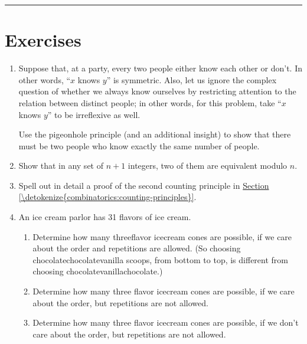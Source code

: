 \documentclass[letterpaper,10pt,english]{sphinxmanual}
\begin{document}
\bigskip\hrule\bigskip



\section{Exercises}
\label{\detokenize{combinatorics:exercises}}\begin{enumerate}
%
\item {} 
\sphinxAtStartPar
Suppose that, at a party, every two people either know each other or don’t. In other words, “\(x\) knows \(y\)” is symmetric. Also, let us ignore the complex question of whether we always know ourselves by restricting attention to the relation between distinct people; in other words, for this problem, take “\(x\) knows \(y\)” to be irreflexive as well.

\sphinxAtStartPar
Use the pigeonhole principle (and an additional insight) to show that there must be two people who know exactly the same number of people.

\item {} 
\sphinxAtStartPar
Show that in any set of \(n + 1\) integers, two of them are equivalent modulo \(n\).

\item {} 
\sphinxAtStartPar
Spell out in detail a proof of the second counting principle in \hyperref[\detokenize{combinatorics:counting-principles}]{Section \ref{\detokenize{combinatorics:counting-principles}}}.

\item {} 
\sphinxAtStartPar
An ice cream parlor has 31 flavors of ice cream.
\begin{enumerate}
%
\item {} 
\sphinxAtStartPar
Determine how many three\sphinxhyphen{}flavor ice\sphinxhyphen{}cream cones are possible, if we care about the order and repetitions are allowed. (So choosing chocolate\sphinxhyphen{}chocolate\sphinxhyphen{}vanilla scoops, from bottom to top, is different from choosing chocolate\sphinxhyphen{}vanilla\sphinxhyphen{}chocolate.)

\item {} 
\sphinxAtStartPar
Determine how many three flavor ice\sphinxhyphen{}cream cones are possible, if we care about the order, but repetitions are not allowed.

\item {} 
\sphinxAtStartPar
Determine how many three flavor ice\sphinxhyphen{}cream cones are possible, if we don’t care about the order, but repetitions are not allowed.


\end{enumerate}
\end{enumerate}
\end{document}
